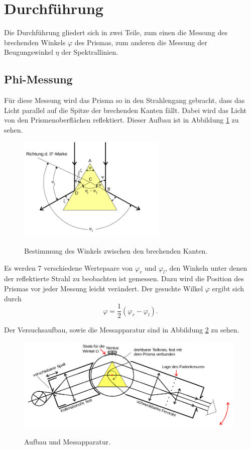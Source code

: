 \section{Durchführung}
\label{sec:Durchführung}
Die Durchführung gliedert sich in zwei Teile, zum einen die Messung
des brechenden Winkels $\varphi$ des Prismas, zum anderen die Messung
der Beugungswinkel $\eta$ der Spektrallinien.

\subsection{Phi-Messung}
Für diese Messung wird das Prisma so in den Strahlengang gebracht, dass
das Licht parallel auf die Spitze der brechenden Kanten fällt.
Dabei wird das Licht von den Prismenoberflächen reflektiert.
Dieser Aufbau ist in Abbildung \ref{fig:phi} zu sehen.

\begin{figure}[H]
  \centering
  \includegraphics[height=5cm]{dreh.png}
  \caption{Bestimmung des Winkels zwischen den brechenden Kanten.}
  \label{fig:phi}
  \cite{skript}
\end{figure}

Es werden 7 verschiedene Wertepaare von $\varphi_r$ und $\varphi_l$,
den Winkeln unter denen der reflektierte Strahl zu beobachten ist
gemessen. Dazu wird die Position des Prismas vor jeder Messung leicht
verändert.
Der gesuchte Wilkel $\varphi$ ergibt sich durch
\begin{equation}
  \varphi=\frac{1}{2}(\varphi_r-\varphi_l).
  \label{eqn:phi}
\end{equation}

Der Versuchsaufbau, sowie die Messapparatur sind in Abbildung
\ref{fig:aufbau} zu sehen.

\begin{figure}
  \centering
  \includegraphics[width=11cm]{aufbau.png}
  \caption{Aufbau und Messapparatur.}
  \label{fig:aufbau}
  \cite{skript}
\end{figure}

